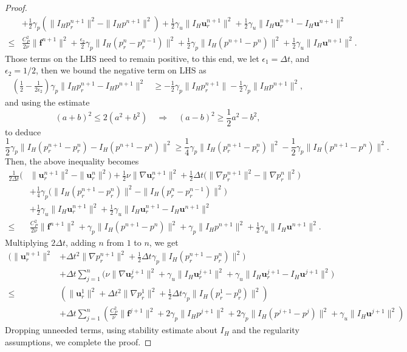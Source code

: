 \documentclass[10pt,twoside,openany,UTF8,CJK]{article}
\begin{document}
\begin{proof}
$$\begin{aligned}
			&+ \frac12\gamma_p\left(\|I_Hp^{n+1}_r\|^2 - \| I_H p^{n+1}\|^2\right) + \frac12\gamma_u\|I_H\boldsymbol{u}_r^{n+1}\|^2 + \frac12\gamma_u\|I_H\boldsymbol{u}^{n+1}_r - I_H\boldsymbol{u}^{n+1}\|^2 \\
		\leq& \frac{C^2_{P}}{2\nu}\|\boldsymbol{f}^{n+1}\|^2 + \frac{\epsilon_{2}}{2}\gamma_p\|I_H(p^{n}_r - p^{n-1}_r)\|^2 + \frac12\gamma_p\|I_H(p^{n+1} - p^{n})\|^2 + \frac12\gamma_u\|I_H\boldsymbol{u}^{n+1}\|^2.
		\end{aligned}
		$$
		Those terms on the LHS need to remain positive, to this end, we let $\epsilon_{1} = \Delta t$, and $\epsilon_{2} = 1/2$, then we bound the negative term on LHS as
		$$
		\begin{aligned}
		\left(\frac12 - \frac{1}{2\epsilon_{2}}\right)\gamma_p\|I_Hp^{n+1}_r - I_H p^{n+1}\|^2	&\geq -\frac12\gamma_p\|I_Hp^{n+1}_r\| -\frac12\gamma_p\|I_H p^{n+1}\|^2,
    	\end{aligned}
		$$
		and using the estimate 
		$$
		(a+b)^2 \leq 2(a^2 + b^2) \quad \Rightarrow \quad(a-b)^2 \geq \frac12 a^2 - b^2,
		$$
		to deduce
		$$
		\frac12\gamma_p\|I_H(p_r^{n+1} - p_r^{n}) - I_H(p^{n+1} - p^{n})\|^2 \geq \frac14\gamma_p\|I_H(p_r^{n+1} - p_r^{n})\|^2 - \frac12\gamma_p\|I_H(p^{n+1} - p^{n})\|^2.
		$$
		Then, the above inequality becomes
		$$
		\begin{aligned}
			\frac{1}{2\Delta t}\Big(&\|\boldsymbol{u}_r^{n+1}\|^2 - \|\boldsymbol{u}_r^{n}\|^2\Big) + \frac12\nu\|\nabla \boldsymbol{u}^{n+1}_r\|^2 + \frac12\Delta t\Big(\|\nabla p^{n+1}_r\|^2 - \|\nabla p^{n}_r\|^2\Big) \\
			&+ \frac14\gamma_p\Big(\|I_H(p_r^{n+1} - p_r^{n})\|^2 - \|I_H(p^{n}_r - p^{n-1}_r)\|^2\Big) \\
			&+ \frac12\gamma_u\|I_H\boldsymbol{u}_r^{n+1}\|^2 + \frac12\gamma_u\|I_H\boldsymbol{u}^{n+1}_r - I_H\boldsymbol{u}^{n+1}\|^2 \\
			\leq& \frac{C^2_{P}}{2\nu}\|\boldsymbol{f}^{n+1}\|^2 + \gamma_p\|I_H(p^{n+1} - p^{n})\|^2 + \gamma_p\| I_H p^{n+1}\|^2 
			+ \frac12\gamma_u\|I_H\boldsymbol{u}^{n+1}\|^2.
		\end{aligned}
		$$
		Multiplying $2\Delta t$, adding $n$ from $1$ to $n$, we get
		$$
		\begin{aligned}
			\Big(\|\boldsymbol{u}_r^{n+1}\|^2 &+ \Delta t^2\|\nabla p^{n+1}_r\|^2 + \frac12\Delta t\gamma_p\|I_H(p^{n+1}_r-p^{n}_r)\|^2\Big) \\
			& + \Delta t\sum_{j=1}^{n}\Big(\nu\|\nabla \boldsymbol{u}^{j+1}_r\|^2 + \gamma_u\|I_H\boldsymbol{u}_r^{j+1}\|^2 + \gamma_u\|I_H\boldsymbol{u}^{j+1}_r - I_H\boldsymbol{u}^{j+1}\|^2 \Big) \\
			\leq& \left(\|\boldsymbol{u}_r^{1}\|^2 + \Delta t^2\|\nabla p^{1}_r\|^2 + \frac12\Delta t\gamma_p\|I_H(p^{1}_r-p^0_r)\|^2\right) \\
			&+ \Delta t\sum_{j=1}^{n}\left(\frac{C^2_{P}}{\nu}\|\boldsymbol{f}^{j+1}\|^2 + 2\gamma_p\| I_H p^{j+1}\|^2 + 2\gamma_p\|I_H(p^{j+1} - p^{j})\|^2 + \gamma_u\|I_H\boldsymbol{u}^{j+1}\|^2\right)
		\end{aligned}
		$$
		Dropping unneeded terms, using stability estimate about $I_H$ and the regularity assumptions, we complete the proof.
	\end{proof}
\end{document}
